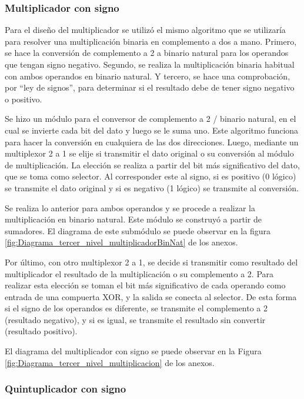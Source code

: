 \documentclass[journal,trans]{IEEEtran}
\begin{document}
\subsubsection{Multiplicador con signo}
Para el diseño del multiplicador se utilizó el mismo algoritmo que se utilizaría para resolver una multiplicación binaria en complemento a dos a mano. Primero, se hace la conversión de complemento a 2 a binario natural para los operandos que tengan signo negativo. Segundo, se realiza la multiplicación binaria habitual con ambos operandos en binario natural. Y tercero, se hace una comprobación, por “ley de signos”, para determinar si el resultado debe de tener signo negativo o positivo.

Se hizo un módulo para el conversor de complemento a 2 / binario natural, en el cual se invierte cada bit del dato y luego se le suma uno. Este algoritmo funciona para hacer la conversión en cualquiera de las dos direcciones. Luego, mediante un multiplexor 2 a 1 se elije si transmitir el dato original o su conversión al módulo de multiplicación. La elección se realiza a partir del bit más significativo del dato, que se toma como selector. Al corresponder este al signo, si es positivo (0 lógico) se transmite el dato original y si es negativo (1 lógico) se transmite al conversión.

Se realiza lo anterior para ambos operandos y se procede a realizar la multiplicación en binario natural. Este módulo se construyó a partir de sumadores. El diagrama de este submódulo se puede observar en la figura \ref{fig:Diagrama_tercer_nivel_multiplicadorBinNat} de los anexos.

Por último, con otro multiplexor 2 a 1, se decide si transmitir como resultado del multiplicador el resultado de la multiplicación o su complemento a 2. Para realizar esta elección se toman el bit más significativo de cada operando como entrada de una compuerta XOR, y la salida se conecta al selector. De esta forma si el signo de los operandos es diferente, se transmite el complemento a 2 (resultado negativo), y si es igual, se transmite el resultado sin convertir (resultado positivo). 

El diagrama del multiplicador con signo se puede observar en la Figura \ref{fig:Diagrama_tercer_nivel_multiplicacion} de los anexos.

\subsubsection{Quintuplicador con signo}
\end{document}
